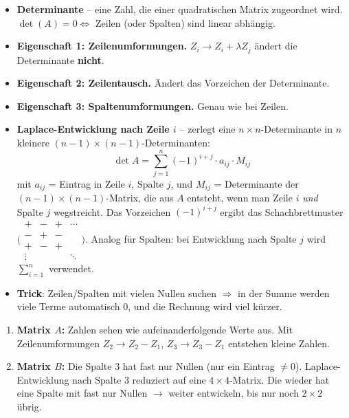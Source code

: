 \documentclass[a4paper,12pt]{article}
\begin{document}
\begin{begriffe}
\begin{itemize}[leftmargin=*, nosep]
    \item \textbf{Determinante} -- eine Zahl, die einer quadratischen Matrix zugeordnet wird. $\det(A) = 0 \iff$ Zeilen (oder Spalten) sind linear abh\"angig.
    \item \textbf{Eigenschaft 1: Zeilenumformungen.} $Z_i \to Z_i + \lambda Z_j$ \"andert die Determinante \textbf{nicht}.
    \item \textbf{Eigenschaft 2: Zeilentausch.} \"Andert das Vorzeichen der Determinante.
    \item \textbf{Eigenschaft 3: Spaltenumformungen.} Genau wie bei Zeilen.
    \item \textbf{Laplace-Entwicklung nach Zeile $i$} -- zerlegt eine $n\times n$-Determinante in $n$ kleinere $(n-1)\times(n-1)$-Determinanten:
    \[
    \boxed{\;\det A = \sum_{j=1}^{n} (-1)^{i+j} \cdot a_{ij} \cdot M_{ij}\;}
    \]
    mit $a_{ij}$ = Eintrag in Zeile $i$, Spalte $j$, und $M_{ij}$ = Determinante der $(n-1)\times(n-1)$-Matrix, die aus $A$ entsteht, wenn man Zeile $i$ \emph{und} Spalte $j$ wegstreicht. Das Vorzeichen $(-1)^{i+j}$ ergibt das Schachbrettmuster $\bigl(\begin{smallmatrix} + & - & + & \cdots \\ - & + & - & \\ + & - & + & \\ \vdots & & & \ddots \end{smallmatrix}\bigr)$. Analog f\"ur Spalten: bei Entwicklung nach Spalte $j$ wird $\sum_{i=1}^{n}$ verwendet.
    \item \textbf{Trick}: Zeilen/Spalten mit vielen Nullen suchen $\Rightarrow$ in der Summe werden viele Terme automatisch $0$, und die Rechnung wird viel k\"urzer.
\end{itemize}
\end{begriffe}

\begin{wastun}
\begin{enumerate}[leftmargin=*, nosep]
    \item \textbf{Matrix $A$:} Zahlen sehen wie aufeinanderfolgende Werte aus. Mit Zeilenumformungen $Z_2 \to Z_2 - Z_1$, $Z_3 \to Z_3 - Z_1$ entstehen kleine Zahlen.
    \item \textbf{Matrix $B$:} Die Spalte 3 hat fast nur Nullen (nur ein Eintrag $\neq 0$). Laplace-Entwicklung nach Spalte 3 reduziert auf eine $4 \times 4$-Matrix. Die wieder hat eine Spalte mit fast nur Nullen $\to$ weiter entwickeln, bis nur noch $2 \times 2$ \"ubrig.
\end{enumerate}
\end{wastun}
\end{document}
